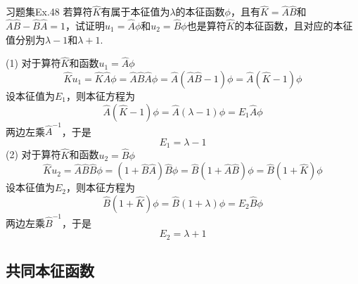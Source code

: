 \begin{question}{习题集Ex.48}
    若算符$\hat{K}$有属于本征值为$\lambda$的本征函数$\phi$，且有$\hat{K}=\hat{A}\hat{B}$和$\hat{A}\hat{B}-\hat{B}\hat{A}=1$，试证明$u_1=\hat{A}\phi$和$u_2=\hat{B}\phi$也是算符$\hat{K}$的本征函数，且对应的本征值分别为$\lambda-1$和$\lambda+1$.
\end{question}
\begin{solution}
    (1) 对于算符$\hat{K}$和函数$u_1=\hat{A}\phi$
    $$
        \hat{K}u_1=\hat{K}\hat{A}\phi=\hat{A}\hat{B}\hat{A}\phi=\hat{A}\left(\hat{A}\hat{B}-1\right)\phi=\hat{A}\left(\hat{K}-1\right)\phi
    $$
    设本征值为$E_1$，则本征方程为
    $$
        \hat{A}\left(\hat{K}-1\right)\phi = \hat{A}\left(\lambda-1\right)\phi = E_1\hat{A}\phi
    $$
    两边左乘$\hat{A}^{-1}$，于是
    $$
        E_1=\lambda-1
    $$
    (2) 对于算符$\hat{K}$和函数$u_2=\hat{B}\phi$
    $$
        \hat{K}u_2=\hat{A}\hat{B}\hat{B}\phi=\left(1+\hat{B}\hat{A}\right)\hat{B}\phi=\hat{B}\left(1+\hat{A}\hat{B}\right)\phi=\hat{B}\left(1+\hat{K}\right)\phi
    $$
    设本征值为$E_2$，则本征方程为
    $$
        \hat{B}\left(1+\hat{K}\right)\phi = \hat{B}\left(1+\lambda\right)\phi = E_2\hat{B}\phi
    $$
    两边左乘$\hat{B}^{-1}$，于是
    $$
        E_2=\lambda+1
    $$
\end{solution}





\subsection{共同本征函数}

